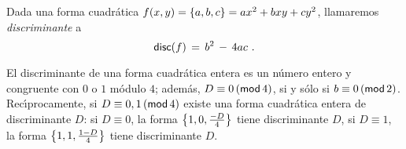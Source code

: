
\begin{defDefiniciones}\label{def:definiciones:discriminante}
	Dada una forma cuadr\'atica $f(x,y)=\binaria{a,b,c}=ax^2+bxy+cy^2$,
	llamaremos \emph{discriminante} a
	\begin{displaymath}
		\discriminante(f)\,=\,b^2\,-\,4ac
		\text{ .}
	\end{displaymath}
\end{defDefiniciones}

\begin{obsDefiniciones}\label{obs:definiciones:discriminante}
	El discriminante de una forma cuadr\'atica entera es un
	n\'umero entero y congruente con $0$ o $1$ m\'odulo $4$;
	adem\'as, $D\equiv 0\tmodulo[4]$, si y s\'olo si
	$b\equiv 0\tmodulo[2]$.
	Rec\'{\i}procamente, si $D\equiv 0,1\tmodulo[4]$ existe una
	forma cuadr\'atica entera de discriminante $D$:
	si $D\equiv 0$, la forma $\binaria{1,0,\frac{-D} 4}$ tiene
	discriminante $D$, si $D\equiv 1$, la forma
	$\binaria{1,1,\frac{1-D} 4}$ tiene discriminante $D$.
\end{obsDefiniciones}


